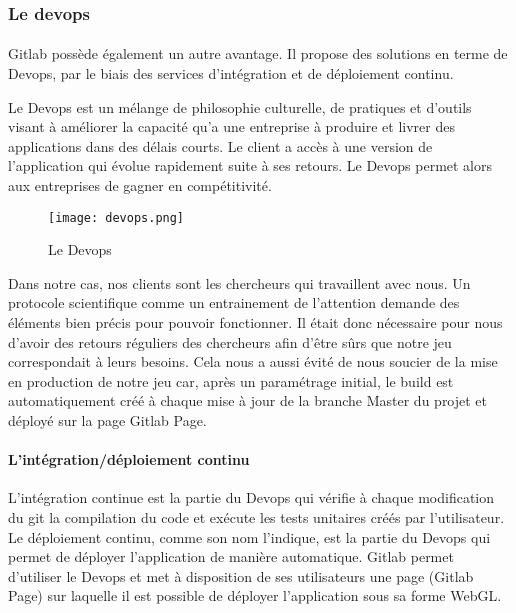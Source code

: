 \subsubsection{Le devops}

\paragraph{}Gitlab possède également un autre avantage. Il propose des solutions en terme de Devops, par le biais des services d'intégration et de déploiement continu.

Le Devops est un mélange de philosophie culturelle, de pratiques et d'outils visant à améliorer la capacité qu'a une entreprise à produire et livrer des applications
dans des délais courts. Le client a accès à une version de l'application qui évolue rapidement suite à ses retours. Le Devops permet alors aux entreprises de gagner en
compétitivité.

\begin{figure}[H]
    \begin{center}
    \texttt{[image: devops.png]}
    \end{center}
    \caption{Le Devops}
\label{Devops}
\end{figure}

Dans notre cas, nos clients sont les chercheurs qui travaillent avec nous. Un protocole scientifique comme un entrainement de l'attention demande des éléments bien précis pour
pouvoir fonctionner. Il était donc nécessaire pour nous d'avoir des retours réguliers des chercheurs afin d'être sûrs que notre jeu correspondait à leurs besoins. Cela nous a aussi
évité de nous soucier de la mise en production de notre jeu car, après un paramétrage initial, le build est automatiquement créé à chaque mise à jour de la branche Master du projet et
déployé sur la page Gitlab Page.

\paragraph{L'intégration/déploiement continu}L'intégration continue est la partie du Devops qui vérifie à chaque modification du git la compilation du code et exécute les tests
unitaires créés par l'utilisateur. Le déploiement continu, comme son nom l'indique, est la partie du Devops qui permet de déployer l'application de manière automatique. Gitlab permet
d'utiliser le Devops et met à disposition de ses utilisateurs une page (Gitlab Page) sur laquelle il est possible de déployer l'application sous sa forme WebGL.

